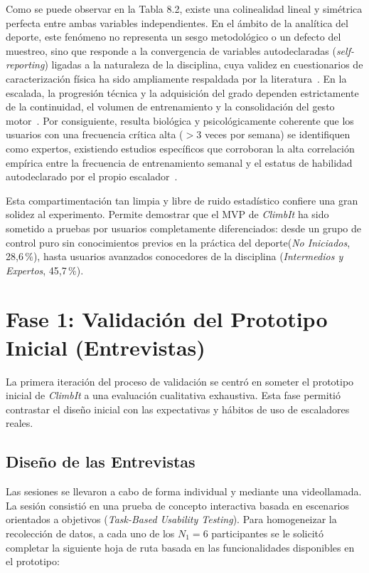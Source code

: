 Como se puede observar en la Tabla 8.2, existe una colinealidad lineal y simétrica perfecta entre ambas variables independientes. En el ámbito de la analítica del deporte, este fenómeno no representa un sesgo metodológico o un defecto del muestreo, sino que responde a la convergencia de variables autodeclaradas (\textit{self-reporting}) ligadas a la naturaleza de la disciplina, cuya validez en cuestionarios de caracterización física ha sido ampliamente respaldada por la literatura~\citep{duncan2002validity}. En la escalada, la progresión técnica y la adquisición del grado dependen estrictamente de la continuidad, el volumen de entrenamiento y la consolidación del gesto motor~\citep{hermans2017climbing}. Por consiguiente, resulta biológica y psicológicamente coherente que los usuarios con una frecuencia crítica alta ($> 3$ veces por semana) se identifiquen como expertos, existiendo estudios específicos que corroboran la alta correlación empírica entre la frecuencia de entrenamiento semanal y el estatus de habilidad autodeclarado por el propio escalador~\citep{drury2022self}.

Esta compartimentación tan limpia y libre de ruido estadístico confiere una gran solidez al experimento. Permite demostrar que el MVP de \textit{ClimbIt} ha sido sometido a pruebas por usuarios completamente diferenciados: desde un grupo de control puro sin conocimientos previos en la práctica del deporte(\textit{No Iniciados}, 28,6\,\%), hasta usuarios avanzados conocedores de la disciplina (\textit{Intermedios y Expertos}, 45,7\,\%).

\section{Fase 1: Validación del Prototipo Inicial (Entrevistas)}

La primera iteración del proceso de validación se centró en someter el prototipo inicial de \textit{ClimbIt} a una evaluación cualitativa exhaustiva. Esta fase permitió contrastar el diseño inicial con las expectativas y hábitos de uso de escaladores reales.

\subsection{Diseño de las Entrevistas}

Las sesiones se llevaron a cabo de forma individual y mediante una videollamada. La sesión consistió en una prueba de concepto interactiva basada en escenarios orientados a objetivos (\textit{Task-Based Usability Testing}). Para homogeneizar la recolección de datos, a cada uno de los $N_1 = 6$ participantes se le solicitó completar la siguiente hoja de ruta basada en las funcionalidades disponibles en el prototipo:

